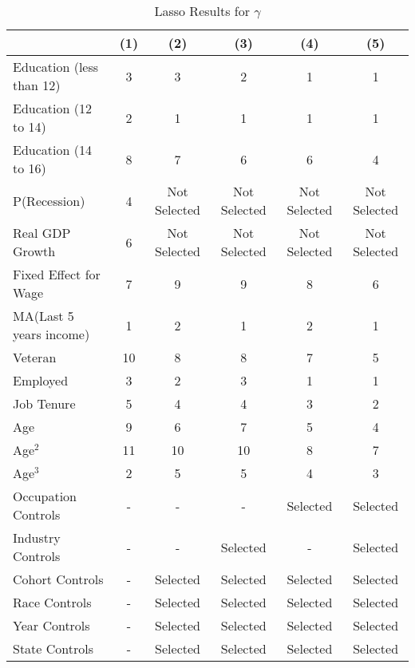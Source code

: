 \documentclass[12pt]{article}
\begin{document}
\begin{table}[H]
\centering
\caption{Lasso Results for $\gamma$}

\begin{tabular}{lccccc}

\toprule
                    & (1)     & (2)   & (3)    & (4)      & (5)         \\

\midrule
Education (less than 12)                &  3  &  3    &  2  &  1   &  1    \\
Education (12 to 14)                &  2  &  1    &  1  &  1   &  1    \\
Education (14 to 16)                &  8  &  7    &  6  &  6   &  4    \\
P(Recession)             &  4    & Not Selected    & Not Selected   & Not Selected    & Not Selected     \\
Real GDP Growth            &  6    & Not Selected     & Not Selected   & Not Selected    & Not Selected     \\
Fixed Effect for Wage         &  7   &  9     &  9   &  8    &  6     \\
MA(Last 5 years income)              &  1   &  2     &  1   &  2    &  1     \\
Veteran             &  10   &  8     &  8   &  7    &  5     \\
Employed                 &  3   &  2     &  3   &  1    &  1     \\
Job Tenure               &  5   &  4     &  4   &  3    &  2     \\
Age          &  9   &  6     &  7   &  5    &  4     \\
Age$^2$        &  11  &  10    &  10  &  8   &  7    \\
Age$^3$      &  2  &  5    &  5  &  4   &  3    \\

\midrule
Occupation Controls      & -   & -    & -  & Selected   & Selected    \\
Industry Controls      & -  & -    & Selected  & -   & Selected    \\
Cohort Controls      & -  & Selected    & Selected  & Selected   & Selected    \\
Race Controls      & -  & Selected    & Selected  & Selected   & Selected    \\
Year Controls      & -  & Selected    & Selected  & Selected   & Selected    \\
State Controls      & -  & Selected    & Selected  & Selected   & Selected    \\



\end{tabular}
\end{table}
\end{document}
